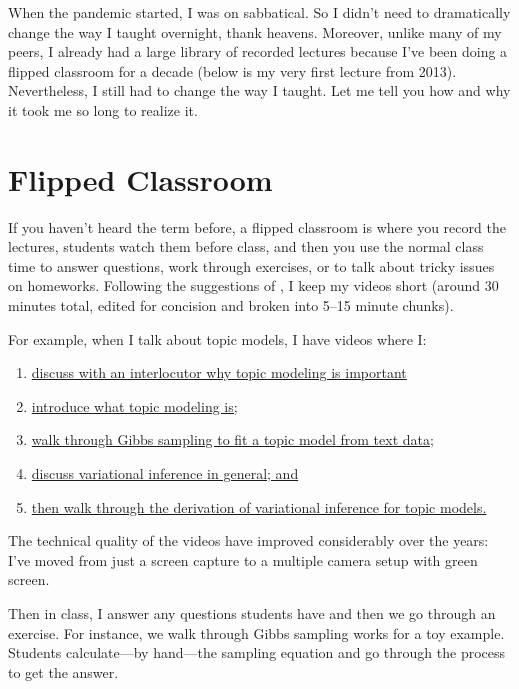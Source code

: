 When the pandemic started, I was on sabbatical.  So I didn't need to
dramatically change the way I taught overnight, thank heavens.
%
Moreover, unlike many of my peers, I
already had a large library of recorded lectures because I've been
doing a flipped classroom for a decade (below is my very first lecture
from 2013).
%
Nevertheless, I still had to change the way I taught.
%
Let me tell you how and why it took me so long to realize it.


\section{Flipped Classroom}

If you haven't heard the term before, a flipped classroom is where you
record the lectures, students watch them before class, and then you
use the normal class time to answer questions, work through exercises,
or to talk about tricky issues on homeworks.
%
Following the
suggestions of , I keep my videos short (around 30
minutes total, edited for concision and broken into 5--15 minute
chunks).

For example, when I talk about topic models, I have videos where I:
  \begin{enumerate}
  \item \href{https://youtu.be/qvr5J9m7Gmw}{discuss with an interlocutor why
    topic modeling is important}
  \item \href{https://www.youtube.com/watch?v=fCmIceNqVog}{introduce what
    topic modeling is;}
  \item \href{https://youtu.be/-tKmyHoVZ-g}{walk through Gibbs sampling to fit
  a topic model from text data;}
  \item \href{https://youtu.be/-tKmyHoVZ-g}{discuss variational inference in
    general; and}
  \item \href{https://youtu.be/smfWKhDcaoA}{then walk through the derivation
    of variational inference for topic models.}
  \end{enumerate}
%
The technical quality of the videos have
improved considerably over the years: I've moved from just a screen
capture to a multiple camera setup with green screen.

Then in class, I answer any questions students have and then we go
through an exercise.
%
For instance, we walk through Gibbs sampling
works for a toy example.
%
Students calculate---by hand---the sampling
equation and go through the process to get the answer.

